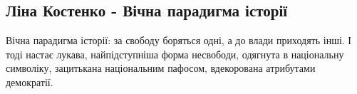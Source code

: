  
 
 

\subsection{Ліна Костенко - Вічна парадигма історії}
\label{sec:06_11_2020.fb.ukrpacificus.1.lina_kostenko}

Вічна парадигма історії: за свободу боряться одні, а до влади приходять інші. І
тоді настає лукава, найпідступніша форма несвободи, одягнута в національну
символіку, зацитькана національним пафосом, вдекорована атрибутами демократії.
